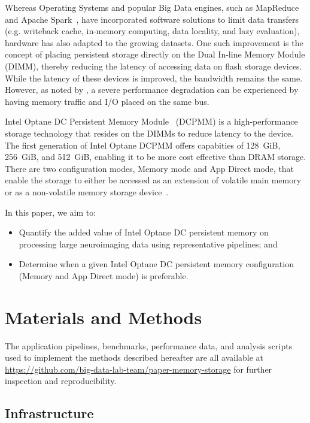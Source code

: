 \documentclass[conference]{IEEEtran}
\begin{document}
Whereas Operating Systems and popular Big Data engines, such as MapReduce~\cite{mapreduce} and Apache Spark~\cite{spark}, have
incorporated software solutions to limit data transfers (e.g. writeback cache, in-memory computing,
data locality, and lazy evaluation), hardware has also adapted to the growing datasets.
One such improvement is the concept of placing persistent storage directly on the Dual
In-line Memory Module (DIMM), thereby reducing the latency of accessing data on 
flash storage devices. While the latency of these devices is improved, the bandwidth
remains the same. However, as noted by \cite{nvdimms}, a severe performance degradation
can be experienced by having memory traffic and I/O placed on the same bus.


Intel Optane DC Persistent Memory Module~\cite{optanebrief} (DCPMM) is a high-performance
storage technology that resides on the DIMMs to reduce latency to the device.
The first generation of Intel Optane DCPMM offers capabities of 128~GiB,
256~GiB, and 512~GiB, enabling it to be more cost effective than DRAM storage.
There are two configuration modes, Memory mode and App Direct mode,
that enable the storage to either be accessed as an extension of volatile main memory
or as a non-volatile memory storage device~\cite{memory-modes}.


In this paper, we aim to:
\begin{itemize}
        \item Quantify the added value of Intel Optane DC persistent memory on 
            processing large neuroimaging data using representative pipelines; and
        \item Determine when a given Intel Optane DC persistent memory configuration (Memory 
            and App Direct mode) is preferable.
\end{itemize}

\section{Materials and Methods}
The application pipelines, benchmarks, performance data, and analysis scripts used 
to implement the methods described hereafter are all available at 
\url{https://github.com/big-data-lab-team/paper-memory-storage} for 
further inspection and reproducibility.

\subsection{Infrastructure}
\end{document}
